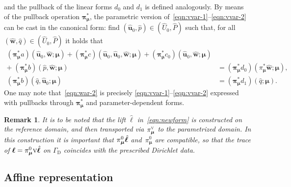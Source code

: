 \documentclass[onecolumn, twoside, a4paper, 11pt]{article}
\newtheorem{remark}{Remark}
\begin{document}
%
and the pullback of the linear forms $d_0$ and $d_1$ is defined analogously. By means of the
pullback operation ${\bm\pi}^*_{\bm\mu}$, the parametric version
of~\eqref{eqn:vvar-1}\nobreakdash--\eqref{eqn:vvar-2} can be cast
in the canonical form: find $(\hat{\bm u}_0, \hat{p}) \in (\hat{U}_0, \hat{P})$ such
that, for all $(\hat{\bm w}, \hat{q}) \in (\hat{U}_0, \hat{P})$ it holds
that
%
\begin{align}
  \nonumber (\bm\pi_{\bm\mu}^* a)(
    \hat{\bm u}_0,
    \hat{\bm w};
    \bm \mu
  ) + (\bm\pi_{\bm\mu}^* c)(
    \hat{\bm u}_0,
    \hat{\bm u}_0,
    \hat{\bm w};
    \bm \mu
  ) + (\bm\pi_{\bm\mu}^* c_0)(
    \hat{\bm u}_0,
    \hat{\bm w};
    \bm \mu
  )
  \\
  + \; (\bm\pi_{\bm\mu}^* b)(
    \hat{p},
    \hat{\bm w};
    \bm \mu
  ) &= (\bm\pi_{\bm\mu}^* d_0)(
    \pi_{\bm \mu}^* \hat{\bm w};
    \bm \mu
  )
  \label{eqn:war-1}, \\
  (\bm\pi_{\bm\mu}^* b)(
    \hat{q},
    \hat{\bm u}_0;
    \bm \mu
  ) &= (\bm\pi_{\bm\mu}^* d_1)(
    \hat{q};
    \bm \mu
  ). \label{eqn:war-2}
\end{align}
%
One may note that~\eqref{eqn:war-2} is precisely \eqref{eqn:vvar-1}--\eqref{eqn:vvar-2} expressed
with pullbacks through $\bm \pi_{\bm \mu}^*$ and parameter-dependent forms.


\begin{remark}
  \label{rem:lift}
  It is to be noted that the lift $\hat{\bm \ell}$ in~\eqref{eqn:newform} is constructed on
  the reference domain, and then transported
  via $\pi_{\bm \mu}^\textsc{v}$ to the parametrized domain. In this construction it is important
  that $\smash[t]{\pi_{\bm \mu}^0 \hat{\bm \ell}}$ and~$\pi_{\bm \mu}^0$ are compatible, so that
  the trace of $\bm{\ell}=\smash[t]{\pi_{\bm \mu}^0\textsc{v}\hat{\bm \ell}}$ on $\Gamma_\text{D}$
  coincides with the prescribed Dirichlet data.
\end{remark}

\subsection{Affine representation}
\label{sec:affrep}
\end{document}
